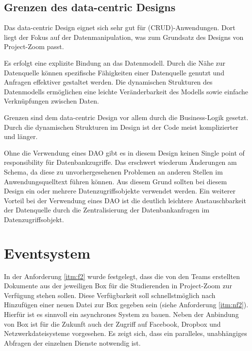 \subsection{Grenzen des data-centric Designs}
Das data-centric Design eignet sich sehr gut für  (CRUD)-Anwendungen. Dort liegt der Fokus auf der Datenmanipulation, was zum Grundsatz des Designs von Project-Zoom passt.

Es erfolgt eine explizite Bindung an das Datenmodell. Durch die Nähe zur Datenquelle können spezifische Fähigkeiten einer Datenquelle genutzt und Anfragen effektiver gestaltet werden. Die dynamischen Strukturen des Datenmodells ermöglichen eine leichte Veränderbarkeit des Modells sowie einfache Verknüpfungen zwischen Daten.

Grenzen sind dem data-centric Design vor allem durch die \gls{Business-Logik} gesetzt. Durch die dynamischen Strukturen im Design ist der Code meist komplizierter und länger.

Ohne die Verwendung eines DAO gibt es in diesem Design keinen Single point of responsibility für Datenbankzugriffe. Das erschwert wiederum Änderungen am Schema, da diese zu unvorhergesehenen Problemen an anderen Stellen im Anwendungsquelltext führen können. Aus diesem Grund sollten bei diesem Design ein oder mehrere Datenzugriffsobjekte verwendet werden. Ein weiterer Vorteil bei der Verwendung eines DAO ist die deutlich leichtere Austauschbarkeit der Datenquelle durch die Zentralisierung der Datenbankanfragen im Datenzugriffsobjekt.


\section{Eventsystem}
In der Anforderung \ref{itm:f2} wurde festgelegt, dass die von den Teams erstellten Dokumente aus der jeweiligen Box für die Studierenden in Project-Zoom zur Verfügung stehen sollen. Diese Verfügbarkeit soll schnellstmöglich nach Hinzufügen einer neuen Datei zur Box gegeben sein (siehe Anforderung \ref{itm:nf2}). Hierfür ist es sinnvoll ein asynchrones System zu bauen.  Neben der Anbindung von Box ist für die Zukunft auch der Zugriff auf Facebook, Dropbox und \gls{Netzwerkdateisystem}e vorgesehen. Es zeigt sich, dass ein paralleles, unabhängiges Abfragen der einzelnen Dienste notwendig ist.

